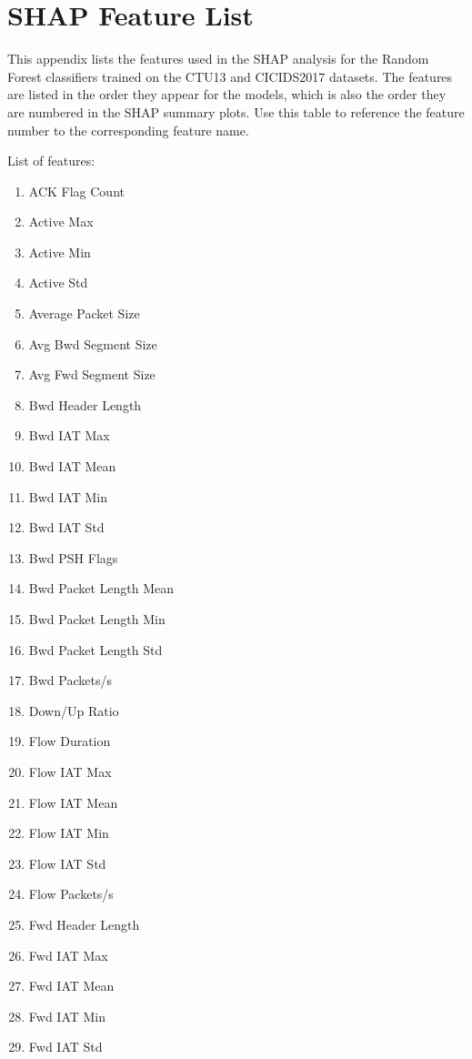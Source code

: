 \chapter{SHAP Feature List}\label{chap:feature-list}

This appendix lists the features used in the SHAP analysis for the Random Forest classifiers trained on the CTU13 and CICIDS2017 datasets. The features are listed in the order they appear for the models, which is also the order they are numbered in the SHAP summary plots. Use this table to reference the feature number to the corresponding feature name.

List of features:

\begin{multicols}{2}
\begin{enumerate}
  \item ACK Flag Count
  \item Active Max
  \item Active Min
  \item Active Std
  \item Average Packet Size
  \item Avg Bwd Segment Size
  \item Avg Fwd Segment Size
  \item Bwd Header Length
  \item Bwd IAT Max
  \item Bwd IAT Mean
  \item Bwd IAT Min
  \item Bwd IAT Std
  \item Bwd PSH Flags
  \item Bwd Packet Length Mean
  \item Bwd Packet Length Min
  \item Bwd Packet Length Std
  \item Bwd Packets/s
  \item Down/Up Ratio
  \item Flow Duration
  \item Flow IAT Max
  \item Flow IAT Mean
  \item Flow IAT Min
  \item Flow IAT Std
  \item Flow Packets/s
  \item Fwd Header Length
  \item Fwd IAT Max
  \item Fwd IAT Mean
  \item Fwd IAT Min
  \item Fwd IAT Std

\end{enumerate}
\end{multicols}
